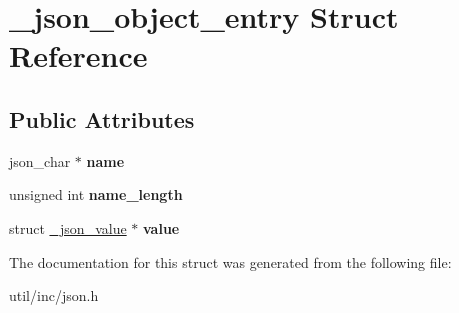 \hypertarget{struct__json__object__entry}{}\section{\+\_\+json\+\_\+object\+\_\+entry Struct Reference}
\label{struct__json__object__entry}
\subsection*{Public Attributes}
\begin{DoxyCompactItemize}
\item 
\mbox{\label{struct__json__object__entry_a18a537c257c35f281aaa48cba51d5c6b}} 
json\+\_\+char $\ast$ {\bfseries name}
\item 
\mbox{\label{struct__json__object__entry_a7b801eaf0971b7a8889f0d377c3b9918}} 
unsigned int {\bfseries name\+\_\+length}
\item 
\mbox{\label{struct__json__object__entry_af78663edf9451c4a701c49782adb69a0}} 
struct \mbox{\hyperlink{struct__json__value}{\+\_\+json\+\_\+value}} $\ast$ {\bfseries value}
\end{DoxyCompactItemize}


The documentation for this struct was generated from the following file\+:\begin{DoxyCompactItemize}
\item 
util/inc/json.\+h\end{DoxyCompactItemize}
